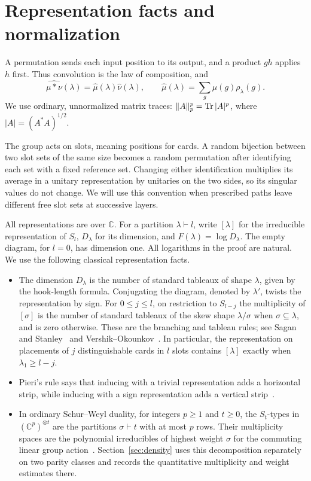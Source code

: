 \section{Representation facts and normalization}\label{sec:prelim}
\label{ac:part:1}

A permutation sends each input position to its output, and a product
\(gh\) applies \(h\) first. Thus convolution is the law of composition,
and
\[
 \widehat{\mu*\nu}(\lambda)
 =\widehat\mu(\lambda)\widehat\nu(\lambda),
 \qquad
 \widehat\mu(\lambda)=\sum_g\mu(g)\rho_\lambda(g).
\]
We use ordinary, unnormalized matrix traces:
\(\|A\|_p^p=\operatorname{Tr}|A|^p\), where \(|A|=(A^*A)^{1/2}\).

The group acts on slots, meaning positions for cards. A random bijection
between two slot sets of the same size becomes a random permutation
after identifying each set with a fixed reference set. Changing either
identification multiplies its average in a unitary representation by
unitaries on the two sides, so its singular values do not change. We
will use this convention when prescribed paths leave different free
slot sets at successive layers.

All representations are over \(\mathbb C\). For a partition
\(\lambda\vdash l\), write \([\lambda]\) for the irreducible
representation of \(S_l\), \(D_\lambda\) for its dimension, and
\(F(\lambda)=\log D_\lambda\). The empty diagram, for \(l=0\), has
dimension one. All logarithms in the proof are natural. We use the
following classical representation facts.
\begin{itemize}
\item The dimension \(D_\lambda\) is the number of standard tableaux
of shape \(\lambda\), given by the hook-length formula. Conjugating
the diagram, denoted by \(\lambda'\), twists the representation by
sign. For \(0\le j\le l\), on restriction to \(S_{l-j}\) the multiplicity of \([\sigma]\)
is the number of standard tableaux of the skew shape
\(\lambda/\sigma\) when \(\sigma\subseteq\lambda\), and is zero
otherwise. These are the branching and tableau rules; see
Sagan and Stanley~\cite{Sagan2001,Stanley1999} and
Vershik--Okounkov~\cite[Theorem~5.8 and Corollary~7.1]{VershikOkounkov2005}.
In particular, the representation on placements of \(j\)
distinguishable cards in \(l\) slots contains \([\lambda]\) exactly
when \(\lambda_1\ge l-j\).

\item Pieri's rule says that inducing with a trivial representation
adds a horizontal strip, while inducing with a sign representation
adds a vertical strip~\cite{Sagan2001,Stanley1999}.

\item In ordinary Schur--Weyl duality, for integers \(p\ge1\) and \(t\ge0\), the \(S_t\)-types in
\((\mathbb C^p)^{\otimes t}\) are the partitions \(\sigma\vdash t\)
with at most \(p\) rows. Their multiplicity spaces are the polynomial
irreducibles of highest weight \(\sigma\) for the commuting linear
group action~\cite{Sagan2001,Stanley1999}. Section~\ref{sec:density}
uses this decomposition separately on two parity classes and records
the quantitative multiplicity and weight estimates there.
\end{itemize}

